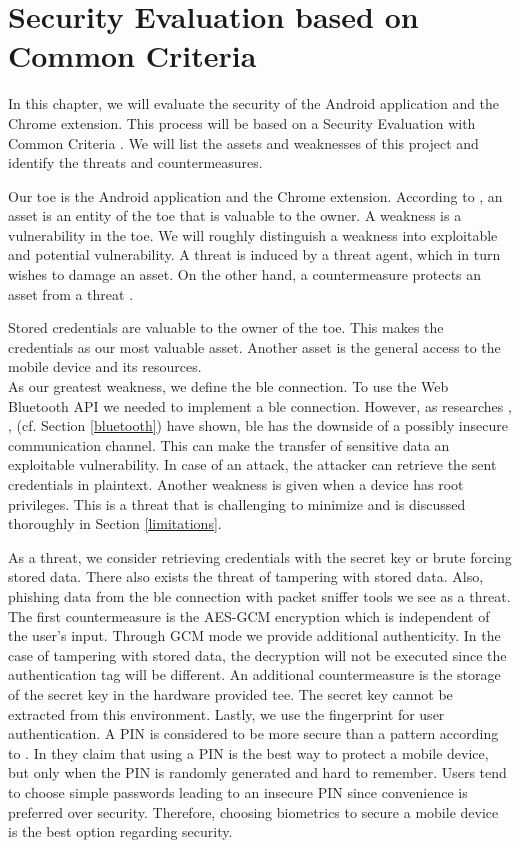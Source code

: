 \section{Security Evaluation based on Common Criteria} \label{seceval}
In this chapter, we will evaluate the security of the Android application and the Chrome extension. This process will be based on a Security Evaluation with Common Criteria \cite{CC}. We will list the assets and weaknesses of this project and identify the threats and countermeasures.

Our \gls{toe} is the Android application and the Chrome extension. According to \cite{CC}, an asset is an entity of the \gls{toe} that is valuable to the owner. A weakness is a vulnerability in the \gls{toe}. We will roughly distinguish a weakness into exploitable and potential vulnerability.
A threat is induced by a threat agent, which in turn wishes to damage an asset. On the other hand, a countermeasure protects an asset from a threat \cite{CC}.

Stored credentials are valuable to the owner of the \gls{toe}. This makes the credentials as our most valuable asset. Another asset is the general access to the mobile device and its resources. \\
%
As our greatest weakness, we define the \gls{ble} connection. To use the Web Bluetooth API we needed to implement a \gls{ble} connection. However, as researches \cite{DBLP:conf/woot/Ryan13}, \cite{DBLP:journals/sensors/GomezOP12}, \cite{IntroductionBLE} (cf. Section \ref{bluetooth}) have shown, \gls{ble} has the downside of a possibly insecure communication channel. This can make the transfer of sensitive data an exploitable vulnerability. In case of an attack, the attacker can retrieve the sent credentials in plaintext. Another weakness is given when a device has root privileges. This is a threat that is challenging to minimize and is discussed thoroughly in Section \ref{limitations}.

As a threat, we consider retrieving credentials with the secret key or brute forcing stored data. There also exists the threat of tampering with stored data. Also, phishing data from the \gls{ble} connection with packet sniffer tools we see as a threat. \\
%
The first countermeasure is the AES-GCM encryption which is independent of the user's input. Through GCM mode we provide additional authenticity. In the case of tampering with stored data, the decryption will not be executed since the authentication tag will be different. An additional countermeasure is the storage of the secret key in the hardware provided \gls{tee}. The secret key cannot be extracted from this environment. Lastly, we use the fingerprint for user authentication. A PIN is considered to be more secure than a pattern according to \cite{PinSaferThanPattern}. In \cite{SecureWayToLockPhone} they claim that using a PIN is the best way to protect a mobile device, but only when the PIN is randomly generated and hard to remember. Users tend to choose simple passwords leading to an insecure PIN since convenience is preferred over security. Therefore, choosing biometrics to secure a mobile device is the best option regarding security.

